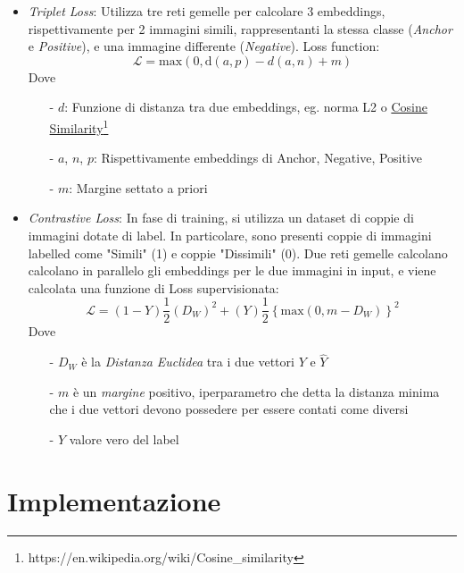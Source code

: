 \documentclass[twocolumn]{article}
\begin{document}
\begin{itemize}[topsep=0pt, noitemsep]
    \item \textit{Triplet Loss}: Utilizza tre reti gemelle per calcolare 3 embeddings, rispettivamente per 2 immagini simili, rappresentanti la stessa classe (\textit{Anchor} e \textit{Positive}),
        e una immagine differente (\textit{Negative}). Loss function:
        \[
            \mathcal{L}=\mathrm{max}\left(0, \mathrm{d}(a,p)-d(a,n)+m\right)
        \]
        Dove
        \begin{itemize}[topsep=0pt, noitemsep]
            \item[-] $d$: Funzione di distanza tra due embeddings, eg. norma L2 o \href{https://en.wikipedia.org/wiki/Cosine_similarity}{Cosine Similarity}\footnote{https://en.wikipedia.org/wiki/Cosine\_similarity}
            \item[-] $a$, $n$, $p$: Rispettivamente embeddings di Anchor, Negative, Positive
            \item[-] $m$: Margine settato a priori
        \end{itemize}
    \item \textit{Contrastive Loss}: In fase di training, si utilizza un dataset di coppie di immagini dotate di label. In particolare, sono presenti coppie di immagini labelled come "Simili" (1) e coppie
        "Dissimili" (0). Due reti gemelle calcolano calcolano in parallelo gli embeddings per le due immagini in input, e viene calcolata una funzione di Loss supervisionata:
        \[
            \mathcal{L}=\left(1-Y\right) \frac{1}{2}\left(D_W\right)^2 + (Y)\frac{1}{2}\left\{\mathrm{max}\left(0,m-D_W\right)\right\}^2
        \]
        Dove
        \begin{itemize}[topsep=0pt, noitemsep]
            \item[-] $D_W$ \`e la \textit{Distanza Euclidea} tra i due vettori $Y$ e $\hat{Y}$
            \item[-] $m$ \`e un \textit{margine} positivo, iperparametro che detta la distanza minima che i due vettori devono possedere per essere contati come diversi
            \item[-] $Y$ valore vero del label
        \end{itemize}
\end{itemize}

\section{Implementazione}
\end{document}
